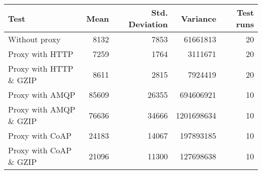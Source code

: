 \begin{tabular}{lrrrr}
\hline
 Test                   &   Mean &   Std. Deviation &   Variance &   Test runs \\
\hline
 Without proxy          &   8132 &             7853 &   61661813 &          20 \\
 Proxy with HTTP        &   7259 &             1764 &    3111671 &          20 \\
 Proxy with HTTP \& GZIP &   8611 &             2815 &    7924419 &          20 \\
 Proxy with AMQP        &  85609 &            26355 &  694606921 &          10 \\
 Proxy with AMQP \& GZIP &  76636 &            34666 & 1201698634 &          10 \\
 Proxy with CoAP        &  24183 &            14067 &  197893185 &          10 \\
 Proxy with CoAP \& GZIP &  21096 &            11300 &  127698638 &          10 \\
\hline
\end{tabular}